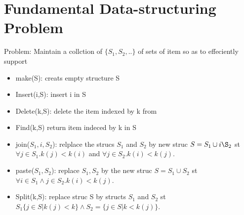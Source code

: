 \documentclass[a4paper]{article}
\begin{document}
\section{Fundamental Data-structuring Problem}
Problem: Maintain a collction of \(\{S_1,S_2,..\}\) of sets of item so as to effeciently support
\begin{itemize}
\item make(S): creats empty structure S
\item Insert(i,S): insert i in S
\item Delete(k,S): delete the item indexed by k from 
\item Find(k,S) return item indeced by k in S
\item join(\(S_1,i,S_2\)): relplace the strucs \(S_1\) and \(S_2\) by new struc \(S=S_1\cup i\S_2\) st \(\forall j\in S_1. k(j) < k(i)\) and \(\forall j \in S_2. k(i) < k(j)\).
\item paste(\(S_1,S_2\)): replace \(S_1,S_2\) by the new struc \(S = S_1 \cup S_2\) st \(\forall i\in S_1 \wedge j \in S_2. k(i) < k(j)\).
\item Split(k,S): replace struc S by structs \(S_1\) and \(S_2\) st \(S_1 \{j\in S | k(j) < k\} \wedge S_2 = \{j \in S | k < k(j)\}\).
\end{itemize}
\end{document}
